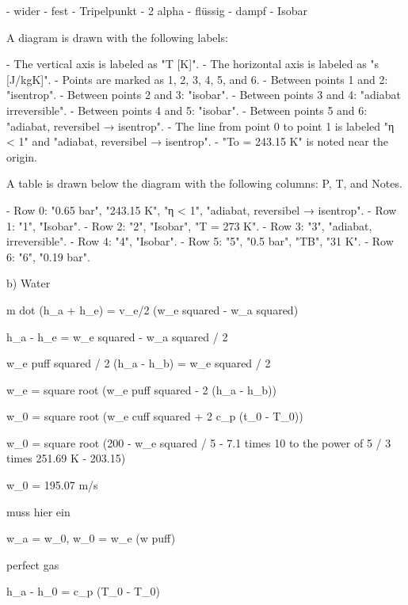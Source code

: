 - wider
- fest
- Tripelpunkt
- 2 alpha
- flüssig
- dampf
- Isobar

A diagram is drawn with the following labels:

- The vertical axis is labeled as "T [K]".
- The horizontal axis is labeled as "s [J/kgK]".
- Points are marked as 1, 2, 3, 4, 5, and 6.
- Between points 1 and 2: "isentrop".
- Between points 2 and 3: "isobar".
- Between points 3 and 4: "adiabat irreversible".
- Between points 4 and 5: "isobar".
- Between points 5 and 6: "adiabat, reversibel → isentrop".
- The line from point 0 to point 1 is labeled "η < 1" and "adiabat, reversibel → isentrop".
- "To = 243.15 K" is noted near the origin.

A table is drawn below the diagram with the following columns: P, T, and Notes.

- Row 0: "0.65 bar", "243.15 K", "η < 1", "adiabat, reversibel → isentrop".
- Row 1: "1", "Isobar".
- Row 2: "2", "Isobar", "T = 273 K".
- Row 3: "3", "adiabat, irreversible".
- Row 4: "4", "Isobar".
- Row 5: "5", "0.5 bar", "TB", "31 K".
- Row 6: "6", "0.19 bar".

b) Water

m dot (h_a + h_e) = v_e/2 (w_e squared - w_a squared)

h_a - h_e = w_e squared - w_a squared / 2

w_e puff squared / 2 (h_a - h_b) = w_e squared / 2

w_e = square root (w_e puff squared - 2 (h_a - h_b))

w_0 = square root (w_e cuff squared + 2 c_p (t_0 - T_0))

w_0 = square root (200 - w_e squared / 5 - 7.1 times 10 to the power of 5 / 3 times 251.69 K - 203.15)

w_0 = 195.07 m/s

muss hier ein

w_a = w_0, w_0 = w_e (w puff)

perfect gas

h_a - h_0 = c_p (T_0 - T_0)